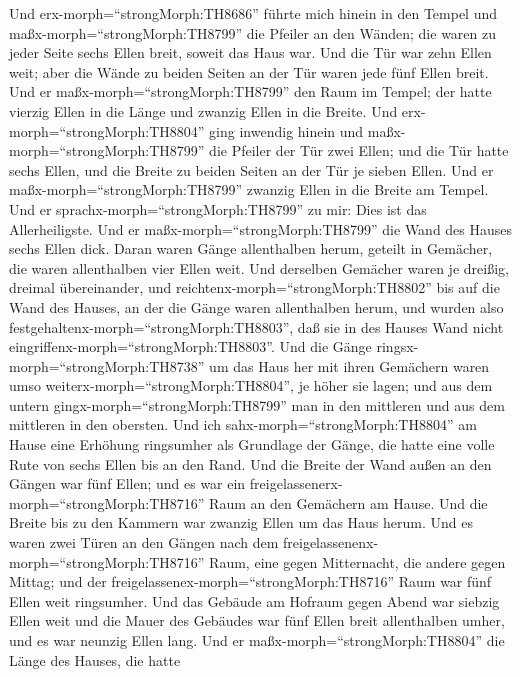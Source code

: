  Und erx-morph=``strongMorph:TH8686'' führte mich hinein in
den Tempel und maßx-morph=``strongMorph:TH8799'' die Pfeiler an den
Wänden; die waren zu jeder Seite sechs Ellen breit, soweit das Haus war.
 Und die Tür war zehn Ellen weit; aber die Wände zu beiden
Seiten an der Tür waren jede fünf Ellen breit. Und er
maßx-morph=``strongMorph:TH8799'' den Raum im Tempel; der hatte vierzig
Ellen in die Länge und zwanzig Ellen in die Breite.  Und
erx-morph=``strongMorph:TH8804'' ging inwendig hinein und
maßx-morph=``strongMorph:TH8799'' die Pfeiler der Tür zwei Ellen; und
die Tür hatte sechs Ellen, und die Breite zu beiden Seiten an der Tür je
sieben Ellen.  Und er maßx-morph=``strongMorph:TH8799''
zwanzig Ellen in die Breite am Tempel. Und er
sprachx-morph=``strongMorph:TH8799'' zu mir: Dies ist das
Allerheiligste.  Und er maßx-morph=``strongMorph:TH8799''
die Wand des Hauses sechs Ellen dick. Daran waren Gänge allenthalben
herum, geteilt in Gemächer, die waren allenthalben vier Ellen weit.
 Und derselben Gemächer waren je dreißig, dreimal
übereinander, und reichtenx-morph=``strongMorph:TH8802'' bis auf die
Wand des Hauses, an der die Gänge waren allenthalben herum, und wurden
also festgehaltenx-morph=``strongMorph:TH8803'', daß sie in des Hauses
Wand nicht eingriffenx-morph=``strongMorph:TH8803''.  Und
die Gänge ringsx-morph=``strongMorph:TH8738'' um das Haus her mit ihren
Gemächern waren umso weiterx-morph=``strongMorph:TH8804'', je höher sie
lagen; und aus dem untern gingx-morph=``strongMorph:TH8799'' man in den
mittleren und aus dem mittleren in den obersten.  Und ich
sahx-morph=``strongMorph:TH8804'' am Hause eine Erhöhung ringsumher als
Grundlage der Gänge, die hatte eine volle Rute von sechs Ellen bis an
den Rand.  Und die Breite der Wand außen an den Gängen war
fünf Ellen; und es war ein freigelassenerx-morph=``strongMorph:TH8716''
Raum an den Gemächern am Hause.  Und die Breite bis zu den
Kammern war zwanzig Ellen um das Haus herum.  Und es waren
zwei Türen an den Gängen nach dem
freigelassenenx-morph=``strongMorph:TH8716'' Raum, eine gegen
Mitternacht, die andere gegen Mittag; und der
freigelassenex-morph=``strongMorph:TH8716'' Raum war fünf Ellen weit
ringsumher.  Und das Gebäude am Hofraum gegen Abend war
siebzig Ellen weit und die Mauer des Gebäudes war fünf Ellen breit
allenthalben umher, und es war neunzig Ellen lang.  Und er
maßx-morph=``strongMorph:TH8804'' die Länge des Hauses, die hatte

